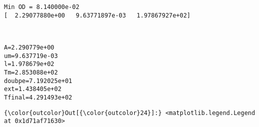 \documentclass[11pt]{article}
\begin{document}
    \begin{Verbatim}[commandchars=\\\{\}]
Min OD = 8.140000e-02
[  2.29077880e+00   9.63771897e-03   1.97867927e+02]

    \end{Verbatim}

    \begin{center}
    \end{center}
    { \hspace*{\fill} \\}
    
    \begin{Verbatim}[commandchars=\\\{\}]
A=2.290779e+00
um=9.637719e-03
l=1.978679e+02
Tm=2.853088e+02
doubpe=7.192025e+01
ext=1.438405e+02
Tfinal=4.291493e+02

    \end{Verbatim}

            \begin{Verbatim}[commandchars=\\\{\}]
{\color{outcolor}Out[{\color{outcolor}24}]:} <matplotlib.legend.Legend at 0x1d71af71630>
\end{Verbatim}
        
    \begin{center}
    \end{center}
    { \hspace*{\fill} \\}
    
    \begin{center}
    \end{center}
    { \hspace*{\fill} \\}
    
\end{document}
